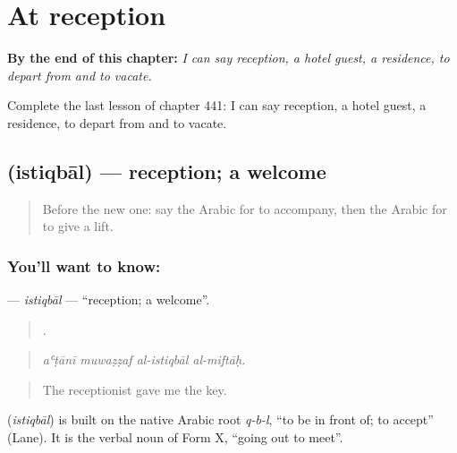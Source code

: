 
\chapter{At reception}
\label{ch:ar-at-reception}

\begin{chapteropening}
\textbf{By the end of this chapter:} \emph{I can say reception, a hotel guest, a residence, to depart from and to vacate.}

Complete the last lesson of chapter 441: I can say reception, a hotel guest, a residence, to depart from and to vacate.
\end{chapteropening}

\section[\texorpdfstring{\ar{استقبال} (istiqbāl)}{استقبال (istiqbāl)}]{ (istiqbāl) — reception; a welcome}

\label{lesson:AR-C441-istiqbal}



\begin{quote}
Before the new one: say the Arabic for to accompany, then the Arabic for to give a lift.
\end{quote}

\subsection*{You'll want to know: }
\textbf{} — \emph{istiqbāl} — \textquotedblleft{}reception; a welcome\textquotedblright{}.

\begin{quote}
   .
\end{quote}

\begin{quote}
\emph{aʿṭānī muwaẓẓaf al-istiqbāl al-miftāḥ.}
\end{quote}

\begin{quote}
The receptionist gave me the key.
\end{quote}

\begin{cousinweb}
\textbf{} (\emph{istiqbāl}) is built on the native Arabic root \emph{q-b-l}, \textquotedblleft{}to be in front of; to accept\textquotedblright{} (Lane). It is the verbal noun of Form X, \textquotedblleft{}going out to meet\textquotedblright{}.
\end{cousinweb}

